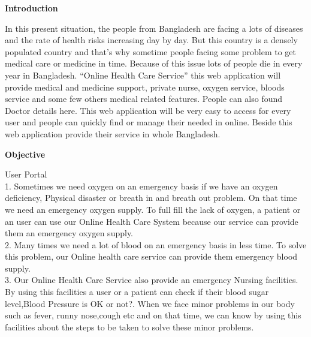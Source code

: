 \documentclass[a4paper,11pt]{paper}
\begin{document}
\clearpage

{\LARGE \textbf{Introduction} \\}
 \vspace{.5\baselineskip}
 
In this present situation, the people from Bangladesh are facing a lots of diseases and the rate of health risks increasing day by day. But this country is a densely populated country and that’s why sometime people facing some problem to get medical care or medicine in time. Because of this issue lots of people die in every year in Bangladesh. “Online Health Care Service” this web application will provide medical and medicine support, private nurse, oxygen service, bloods service and some few others medical related features. People can also found Doctor details here. This web application will be very easy to access for every user and people can quickly find or manage their needed in online. Beside this web application provide their service in whole Bangladesh.

   \vspace{2\baselineskip}
   
 {\LARGE \textbf{Objective} \\}
 \vspace{.5\baselineskip}
 
 User Portal\\

1. Sometimes we need oxygen on an emergency basis if we have an oxygen deficiency, Physical disaster or breath in and breath out problem. On that time we need an emergency oxygen supply. To full fill the lack of oxygen, a patient or an user can use our Online Health Care System because our service can provide them an emergency oxygen supply.\\

2. Many times we need a lot of blood on an emergency basis in less time. To solve this problem, our Online health care service can provide them emergency blood supply.\\ 

3. Our Online Health Care Service also provide an emergency Nursing facilities. By using this facilities a user or a patient can check if their blood sugar level,Blood Pressure is OK or not?. When we face minor problems in our body such as fever, runny nose,cough etc and on that time, we can know by using this facilities about the steps to be taken to solve these minor problems.\\
\end{document}

